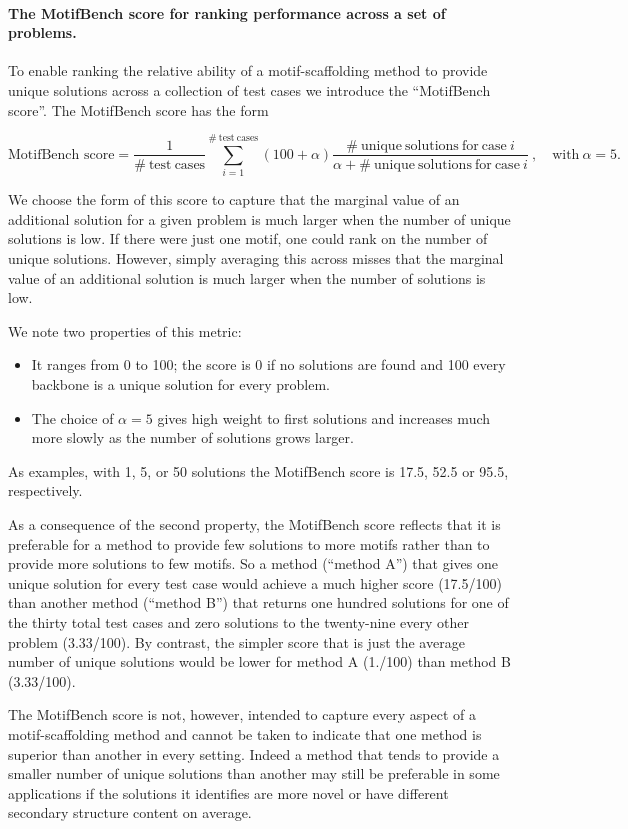 \paragraph{The MotifBench score for ranking performance across a set of problems.}
To enable ranking the relative ability of a motif-scaffolding method to provide unique solutions across a collection of test cases we introduce the ``MotifBench score''.  The MotifBench score has the form

$$
\textrm{MotifBench score} = \frac{1}{\# \mathrm{\ test\ cases}} \sum_{i=1}^{\# \mathrm{\ test\ cases}} (100 + \alpha) \frac{\#\mathrm{\ unique \ solutions\ for\ case\ } i}{\alpha + \# \mathrm{\ unique \ solutions \ for \ case\ } i}\ , \quad \mathrm{with}\  \alpha=5.
$$

We choose the form of this score to capture that the marginal value of an additional solution for a given problem is much larger when the number of unique solutions is low.  If there were just one motif, one could rank on the number of unique solutions.
However, simply averaging this across misses that the marginal value of an additional solution is much larger when the number of solutions is low.

We note two properties of this metric:
\begin{itemize}
    \item It ranges from 0 to 100; the score is 0 if no solutions are found and 100 every backbone is a unique solution for every problem.
    \item The choice of $\alpha =5$ gives high weight to first solutions and increases much more slowly as the number of solutions grows larger.
\end{itemize}
As examples, with 1, 5, or 50 solutions the MotifBench score is 17.5, 52.5 or 95.5, respectively.

As a consequence of the second property, the MotifBench score reflects that it is preferable for a method to provide few solutions to more motifs rather than to provide more solutions to few motifs.
So a method (``method A'') that gives one unique solution for every test case would achieve a much higher score (17.5/100) than another method (``method B'') that returns one hundred solutions for one of the thirty total test cases and zero solutions to the twenty-nine every other problem (3.33/100).  By contrast, the simpler score that is just the average number of unique solutions would be lower for method A (1./100) than method B (3.33/100).


The MotifBench score is not, however, intended to capture every aspect of a motif-scaffolding method and cannot be taken to indicate that one method is superior than another in every setting.  Indeed a method that tends to provide a smaller number of unique solutions than another may still be preferable in some applications if the solutions it identifies are more novel or have different secondary structure content on average.



